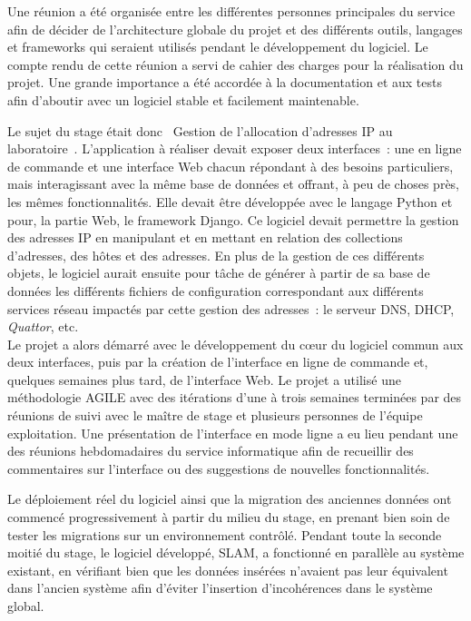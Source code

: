 \documentclass[12pt,a4paper,twoside]{report}
\begin{document}
Une réunion a été organisée entre les différentes personnes principales du
service afin de décider de l’architecture globale du projet et des différents
outils, langages et frameworks qui seraient utilisés pendant le développement
du logiciel. Le compte rendu de cette réunion a servi de cahier des charges
pour la réalisation du projet. Une grande importance a été accordée à la
documentation et aux tests afin d’aboutir avec un logiciel stable et
facilement maintenable.

Le sujet du stage était donc \og~Gestion de l’allocation d’adresses IP au
laboratoire~\fg{}. L’application à réaliser devait exposer deux interfaces~:
une en ligne de commande et une interface Web chacun répondant à des besoins
particuliers, mais interagissant avec la même base de données et offrant, à peu
de choses près, les mêmes fonctionnalités. Elle devait être développée avec le
langage Python et pour, la partie Web, le framework Django. Ce logiciel devait
permettre la gestion des adresses IP en manipulant et en mettant en relation
des collections d’adresses, des hôtes et des adresses. En plus de la gestion de
ces différents objets, le logiciel aurait ensuite pour tâche de générer à
partir de sa base de données les différents fichiers de configuration
correspondant aux différents services réseau impactés par cette gestion des
adresses~: le serveur DNS, DHCP, \emph{Quattor}, etc.\\

Le projet a alors démarré avec le développement du cœur du logiciel commun aux
deux interfaces, puis par la création de l’interface en ligne de commande et,
quelques semaines plus tard, de l’interface Web. Le projet a utilisé une
méthodologie AGILE avec des itérations d’une à trois semaines terminées par des
réunions de suivi avec le maître de stage et plusieurs personnes de l’équipe
exploitation. Une présentation de l’interface en mode ligne a eu lieu pendant
une des réunions hebdomadaires du service informatique afin de recueillir des
commentaires sur l’interface ou des suggestions de nouvelles fonctionnalités.

Le déploiement réel du logiciel ainsi que la migration des anciennes données
ont commencé progressivement à partir du milieu du stage, en prenant bien soin
de tester les migrations sur un environnement contrôlé. Pendant toute la
seconde moitié du stage, le logiciel développé, SLAM, a fonctionné en parallèle
au système existant, en vérifiant bien que les données insérées n’avaient pas
leur équivalent dans l’ancien système afin d’éviter l’insertion d’incohérences
dans le système global.
\end{document}
